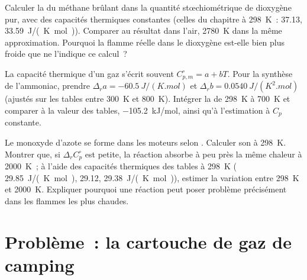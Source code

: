 \begin{exercise}[$\star\star\star$]\label{exo:b2:reaction-enthalpy:10}
Calculer la  du méthane brûlant dans la
quantité stœchiométrique de dioxygène pur, avec des capacités thermiques constantes (celles
du chapitre à \qty{298}{K}~:  37.13, 
\qty{33.59}{J/(K.mol)}). Comparer au résultat dans l'air,
\qty{2780}{K} dans la même approximation. Pourquoi la flamme réelle dans le dioxygène est-elle
bien plus froide que ne l'indique ce calcul~?
\end{exercise}

\begin{exercise}[$\star\star\star$]\label{exo:b2:reaction-enthalpy:11}
La capacité thermique d'un gaz s'écrit souvent $C_{p,m}^\circ = a + bT$. Pour
la synthèse de l'ammoniac, prendre $\Delta_r a = \qty{-60.5}{J/(K.mol)}$ et
$\Delta_r b = \qty{0.0540}{J/(K^2.mol)}$ (ajustés sur les tables entre
\qty{300}{K} et \qty{800}{K}). Intégrer la  de
\qty{298}{K} à \qty{700}{K} et comparer à la valeur des tables,
\qty{-105.2}{kJ/mol}, ainsi qu'à l'estimation à $C_p$ constante.
\end{exercise}

\begin{exercise}[$\star\star\star$]\label{exo:b2:reaction-enthalpy:12}
Le monoxyde d'azote se forme dans les moteurs selon .
Calculer son  à \qty{298}{K}. Montrer que, si
$\Delta_r C_p^\circ$ est petite, la réaction absorbe à peu près la même chaleur à
\qty{2000}{K}~; à l'aide des capacités thermiques des tables à \qty{298}{K}
( \qty{29.85}{J/(K.mol)},  29.12, 
\qty{29.38}{J/(K.mol)}), estimer la variation entre
\qty{298}{K} et \qty{2000}{K}. Expliquer pourquoi une réaction  peut poser
problème précisément dans les flammes les plus chaudes.
\end{exercise}

\section{Problème~: la cartouche de gaz de camping}

